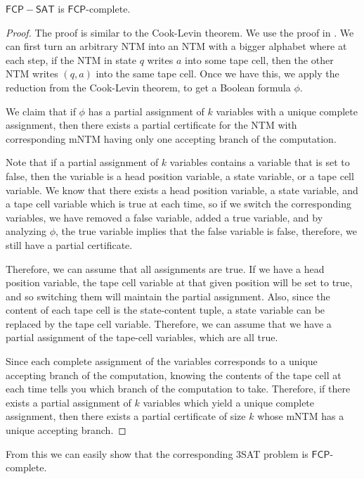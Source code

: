 \documentclass[runningheads,a4paper]{llncs}
\begin{document}
\begin{theorem}
$\mathsf{FCP-SAT}$ is $\mathsf{FCP}$-complete.
\end{theorem}

\begin{proof}
The proof is similar to the Cook-Levin theorem. We use the proof in \cite{Garey}. We can first turn an arbitrary NTM into an NTM with a bigger alphabet where at each step, if the NTM in state $q$ writes $a$ into some tape cell, then the other NTM writes $(q,a)$ into the same tape cell. Once we have this, we apply the reduction from the Cook-Levin theorem, to get a Boolean formula $\phi$. 

We claim that if $\phi$ has a partial assignment of $k$ variables with a unique complete assignment, then there exists a partial certificate for the NTM with corresponding mNTM having only one accepting branch of the computation.

Note that if a partial assignment of $k$ variables contains a variable that is set to false, then the variable is a head position variable, a state variable, or a tape cell variable. We know that there exists a head position variable, a state variable, and a tape cell variable which is true at each time, so if we switch the corresponding variables, we have removed a false variable, added a true variable, and by analyzing $\phi$, the true variable implies that the false variable is false, therefore, we still have a partial certificate. 

Therefore, we can assume that all assignments are true. If we have a head position variable, the tape cell variable at that given position will be set to true, and so switching them will maintain the partial assignment. Also, since the content of each tape cell is the state-content tuple, a state variable can be replaced by the tape cell variable. Therefore, we can assume that we have a partial assignment of the tape-cell variables, which are all true. 

Since each complete assignment of the variables corresponds to a unique accepting branch of the computation, knowing the contents of the tape cell at each time tells you which branch of the computation to take. Therefore, if there exists a partial assignment of $k$ variables which yield a unique complete assignment, then there exists a partial certificate of size $k$ whose mNTM has a unique accepting branch.
\end{proof}

From this we can easily show that the corresponding 3SAT problem is $\mathsf{FCP}$-complete.
\end{document}

